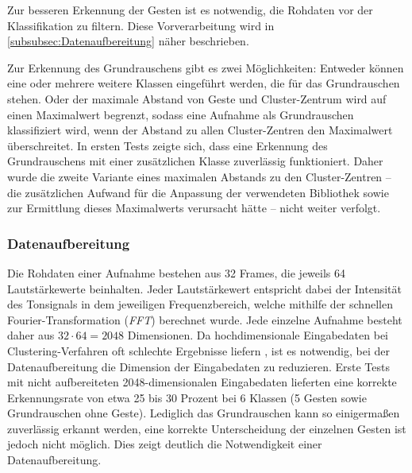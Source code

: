 Zur besseren Erkennung der Gesten ist es notwendig, die Rohdaten vor der Klassifikation zu filtern. Diese Vorverarbeitung wird in \autoref{subsubsec:Datenaufbereitung} näher beschrieben.

Zur Erkennung des Grundrauschens gibt es zwei Möglichkeiten: Entweder können eine oder mehrere weitere Klassen eingeführt werden, die für das Grundrauschen stehen. Oder der maximale Abstand von Geste und Cluster-Zentrum wird auf einen Maximalwert begrenzt, sodass
eine Aufnahme als Grundrauschen klassifiziert wird, wenn der Abstand zu allen Cluster-Zentren den Maximalwert überschreitet.
In ersten Tests zeigte sich, dass eine Erkennung des Grundrauschens mit einer zusätzlichen Klasse zuverlässig funktioniert. Daher wurde die zweite Variante eines maximalen Abstands zu den Cluster-Zentren -- die zusätzlichen Aufwand für die Anpassung der verwendeten Bibliothek sowie zur Ermittlung dieses Maximalwerts verursacht hätte -- nicht weiter verfolgt.


\subsubsection{Datenaufbereitung}\label{subsubsec:Datenaufbereitung}


Die Rohdaten einer Aufnahme bestehen aus 32 Frames, die jeweils 64 Lautstärkewerte beinhalten. Jeder Lautstärkewert entspricht dabei der Intensität des Tonsignals in dem jeweiligen Frequenzbereich, welche mithilfe der schnellen Fourier-Transformation (\emph{FFT}) \cite{fftMathebuch} berechnet wurde. Jede einzelne Aufnahme besteht daher aus $32 \cdot 64 = 2048$ Dimensionen.  Da hochdimensionale Eingabedaten bei Clustering-Verfahren oft schlechte Ergebnisse liefern \cite{kMeansHighDimensions}, ist es notwendig, bei der Datenaufbereitung die Dimension der Eingabedaten zu reduzieren.  Erste Tests mit nicht aufbereiteten 2048-dimensionalen Eingabedaten lieferten eine korrekte Erkennungsrate von etwa 25 bis 30 Prozent bei 6 Klassen (5 Gesten sowie Grundrauschen ohne Geste). Lediglich das Grundrauschen kann so einigermaßen zuverlässig erkannt werden, eine korrekte Unterscheidung der einzelnen Gesten ist jedoch nicht möglich. Dies zeigt deutlich die Notwendigkeit einer Datenaufbereitung.

